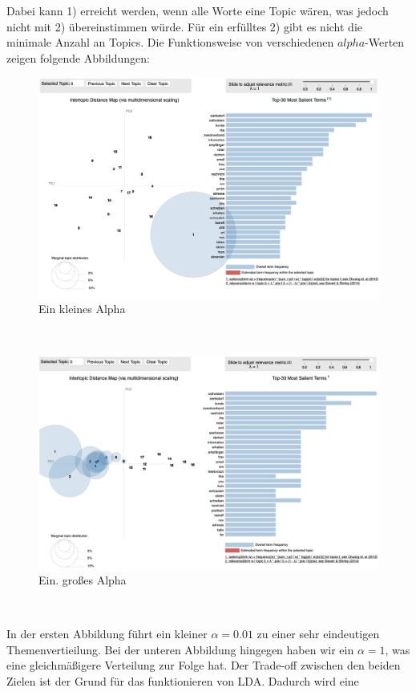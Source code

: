 \documentclass[german,version-2020-11]{uzl-thesis}
\begin{document}
Dabei kann 1) erreicht werden, wenn alle Worte eine Topic wären, was jedoch nicht mit 2) übereinstimmen würde. Für ein erfülltes 2) gibt es nicht die minimale Anzahl an Topics. Die Funktionsweise von verschiedenen $alpha$-Werten zeigen folgende Abbildungen: 
\\
\begin{center}
\begin{figure}[h]
\includegraphics[scale=0.3]{lda_alpha001.png}
\caption{Ein kleines Alpha} 
\end{figure}\\
\begin{figure}[h]
\includegraphics[scale=0.3]{lda_alpha1.png}
\caption{Ein. großes Alpha}
\end{figure}\\
\end{center}
In der ersten Abbildung führt ein kleiner $\alpha = 0.01$ zu einer sehr eindeutigen Themenvertieilung. Bei der unteren Abbildung hingegen haben wir ein $\alpha = 1$, was eine gleichmäßigere Verteilung zur Folge hat. Der Trade-off zwischen den beiden Zielen ist der Grund für das funktionieren von LDA. Dadurch wird eine
\end{document}
